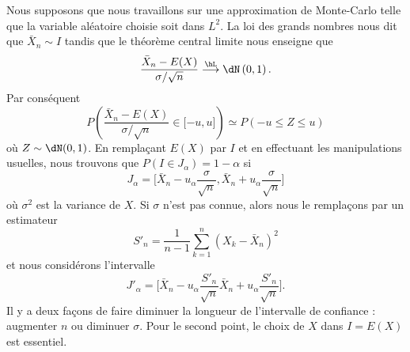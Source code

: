 Nous supposons que nous travaillons sur une approximation de Monte-Carlo telle que la variable aléatoire choisie soit dans \( L^2\). La loi des grands nombres nous dit que \( \bar X_n\sim I\) tandis que le théorème central limite nous enseigne que
\begin{equation}
    \frac{ \bar X_n-E(X) }{ \sigma/\sqrt{n} }\stackrel{\hL}{\longrightarrow}\dN\left( 0,1 \right).
\end{equation}
Par conséquent
\begin{equation}
    P\left( \frac{ \bar X_n-E(X) }{ \sigma/\sqrt{n} }\in\mathopen[ -u , u \mathclose] \right)\simeq P(-u\leq Z\leq u)
\end{equation}
où \( Z\sim\dN(0,1)\). En remplaçant \( E(X)\) par \( I\) et en effectuant les manipulations usuelles, nous trouvons que \( P(I\in J_{\alpha})=1-\alpha\) si
\begin{equation}
    J_{\alpha}=\big[ \bar X_n-u_{\alpha}\frac{ \sigma }{ \sqrt{n} },\bar X_n+u_{\alpha}\frac{ \sigma }{ \sqrt{n} } \big]
\end{equation}
où \( \sigma^2\) est la variance de \( X\). Si \( \sigma\) n'est pas connue, alors nous le remplaçons par un estimateur
\begin{equation}
    S'_n=\frac{1}{ n-1 }\sum_{k=1}^n(X_k-\bar X_n)^2
\end{equation}
et nous considérons l'intervalle
\begin{equation}
    J'_{\alpha}=\big[ \bar X_n-u_{\alpha}\frac{ S'_n }{ \sqrt{n} }\bar X_n+u_{\alpha}\frac{ S'_n }{ \sqrt{n} } \big].
\end{equation}
Il y a deux façons de faire diminuer la longueur de l'intervalle de confiance : augmenter \( n\) ou diminuer \( \sigma\). Pour le second point, le choix de \( X\) dans \( I=E(X)\) est essentiel.

